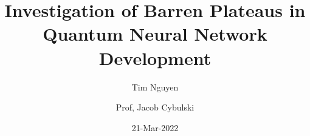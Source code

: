 

\title{Investigation of Barren Plateaus in Quantum Neural Network Development}
\date{21-Mar-2022}
\author{Tim Nguyen \and Prof, Jacob Cybulski}

% 


